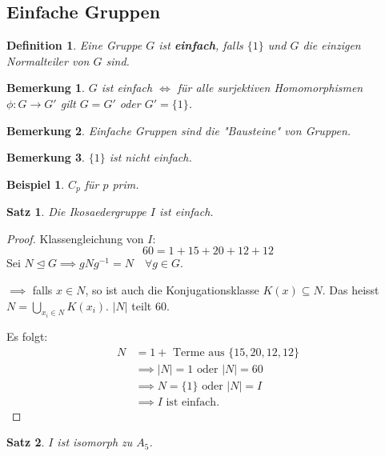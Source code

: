 \documentclass{article}
\theoremstyle{plain}
\newtheorem{definition}{Definition}
\newtheorem{theorem}{Satz}
\newtheorem{beispiel}{Beispiel}
\newtheorem{bemerkung}{Bemerkung}
\newcommand{\defn}[1]{\textbf{#1}}
\newcommand{\normal}{\trianglelefteq}
\begin{document}
\subsection*{Einfache Gruppen}
\begin{definition}
    Eine Gruppe $G$ ist \defn{einfach}, falls $\{1\}$ und $G$ die einzigen Normalteiler von $G$ sind.
\end{definition}
\begin{bemerkung}
    $G$ ist einfach $\Leftrightarrow$ für alle surjektiven Homomorphismen $\phi\colon G\to G'$ gilt $G=G'$ oder $G'=\{1\}$.
\end{bemerkung}
\begin{bemerkung}
    Einfache Gruppen sind die "Bausteine" von Gruppen.
\end{bemerkung}
\begin{bemerkung}
    $\{1\}$ ist nicht einfach.
\end{bemerkung}
\begin{beispiel}
    $C_p$ für $p$ prim.
\end{beispiel}
\begin{theorem}
    Die Ikosaedergruppe $I$ ist einfach.
\end{theorem}
\begin{proof}
    Klassengleichung von $I$:
    $$60=1+15+20+12+12$$
    Sei $N\normal G \implies gNg^{-1}=N \quad \forall g\in G$.

    $\implies$ falls $x\in N$, so ist auch die Konjugationsklasse $K(x)\subseteq N$. Das heisst $N=\bigcup\limits_{x_i\in N}K(x_i)$. $|N|$ teilt 60.

    Es folgt:
    \begin{align*}
    N&=1+\text{ Terme aus }\{15,20,12,12\}\\
    &\implies |N|=1 \text{ oder }|N|=60\\
    &\implies N = \{1\} \text{ oder } |N|=I\\
    &\implies I \text{ ist einfach.}
    \end{align*}
\end{proof}
\begin{theorem}
    $I$ ist isomorph zu $A_5$.
\end{theorem}
\end{document}
